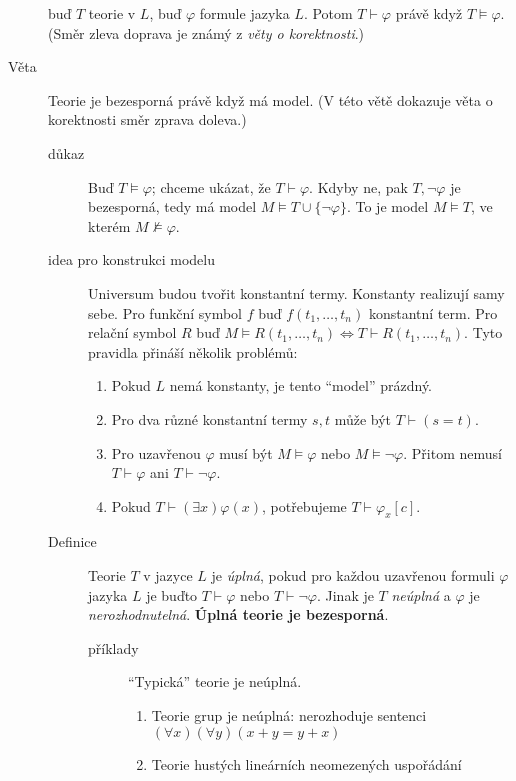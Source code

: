 \documentclass[a4paper]{article}
\begin{document}
\begin{description}
			buď $T$ teorie v $L$, buď $\varphi$ formule jazyka $L$. Potom $T \vdash \varphi$ právě
			když $T \models \varphi$. (Směr zleva doprava je známý z \textit{věty o korektnosti}.)
		\item[Věta] Teorie je bezesporná právě když má model. (V této větě dokazuje
			věta o korektnosti směr zprava doleva.)
			\begin{description}
				\item[důkaz] Buď $T \models \varphi$; chceme ukázat, že $T \vdash \varphi$.
					Kdyby ne, pak $T, \neg \varphi$ je bezesporná, tedy má model
					$M \models T \cup \{\neg \varphi\}$. To je model $M \models T$,
					ve kterém $M \not \models \varphi$.
				\item[idea pro konstrukci modelu] Universum budou tvořit
					konstantní termy. Konstanty realizují samy sebe.
					Pro funkční symbol $f$ buď $f(t_1, \ldots, t_n)$ konstantní term.
					Pro relační symbol $R$ buď $M \models R(t_1, \ldots, t_n) \iff
					T \vdash R(t_1, \ldots, t_n)$. Tyto pravidla přináší několik
					problémů:
					\begin{enumerate}
						\item Pokud $L$ nemá konstanty, je tento \enquote{model} prázdný.
						\item Pro dva různé konstantní termy $s, t$ může být
							$T \vdash (s = t)$.
						\item Pro uzavřenou $\varphi$ musí být $M \models \varphi$ nebo
							$M \models \neg \varphi$. Přitom nemusí $T \vdash \varphi$
							ani $T \vdash \neg \varphi$.
						\item Pokud $T \vdash (\exists x) \varphi(x)$, potřebujeme
							$T \vdash \varphi_x[c]$.
					\end{enumerate}
				\item[Definice] Teorie $T$ v jazyce $L$ je \textit{úplná}, pokud pro
					každou uzavřenou formuli $\varphi$ jazyka $L$ je buďto $T \vdash \varphi$
					nebo $T \vdash \neg \varphi$. Jinak je $T$ \textit{neúplná} a
					$\varphi$ je \textit{nerozhodnutelná}. \textbf{Úplná teorie
					je bezesporná}.
					\begin{description}
						\item[příklady] \enquote{Typická} teorie je neúplná.
							\begin{enumerate}
								\item Teorie grup je neúplná: nerozhoduje sentenci
									$(\forall x)(\forall y)(x + y = y + x)$
								\item Teorie hustých lineárních neomezených uspořádání

\end{enumerate}
\end{description}
\end{description}
\end{description}
\end{document}
